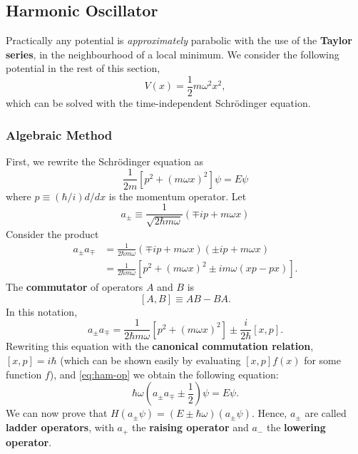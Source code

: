 \documentclass{article}
\begin{document}
\subsection{Harmonic Oscillator}

Practically any potential is \emph{approximately} parabolic with the use of the
\textbf{Taylor series}, in the neighbourhood of a local minimum. We consider
the following potential in the rest of this section,
\begin{equation} \label{eq:har-osc}
  V(x) = \frac{1}{2} m \omega^2 x^2,
\end{equation}
which can be solved with the time-independent Schr\"{o}dinger equation.

\subsubsection{Algebraic Method}

First, we rewrite the Schr\"{o}dinger equation as \[
  \frac{1}{2m}[p^2 + (m \omega x)^2]\psi = E\psi
\] where $p \equiv (\hbar/i)d/dx$ is the momentum operator. Let
\begin{equation} \label{eq:har-osc-alg-a}
  \boxed{
    a_{\pm} \equiv \frac{1}{\sqrt{2 \hbar m \omega}}(\mp ip + m \omega x)
  }
\end{equation}
Consider the product
\begin{align*}
  a_{\pm}a_{\mp}
  &= \frac{1}{2 \hbar m \omega}(\mp ip + m \omega x)(\pm ip + m \omega x) \\
  &= \frac{1}{2 \hbar m \omega}[p^2 + (m \omega x)^2 \pm im\omega(xp - px)].
\end{align*}
The \textbf{commutator} of operators $A$ and $B$ is \[
  [A, B] \equiv AB - BA.
\] In this notation, \[
  a_{\pm}a_{\mp}
  = \frac{1}{2 \hbar m \omega}[p^2 + (m \omega x)^2]
  \pm \frac{i}{2\hbar}[x, p].
\] Rewriting this equation with the \textbf{canonical commutation relation},
$[x, p] = i\hbar$ (which can be shown easily by evaluating $[x, p]f(x)$ for
some function $f$), and \eqref{eq:ham-op} we obtain the following equation:
\begin{equation} \label{eq:har-osc-alg}
  \hbar\omega\left(a_{\pm}a_{\mp} \pm \frac{1}{2}\right)\psi = E\psi.
\end{equation}
We can now prove that $H(a_{\pm}\psi) = (E \pm \hbar\omega)(a_{\pm}\psi)$.
Hence, $a_{\pm}$ are called \textbf{ladder operators}, with $a_+$ the
\textbf{raising operator} and $a_-$ the \textbf{lowering operator}.
\end{document}
